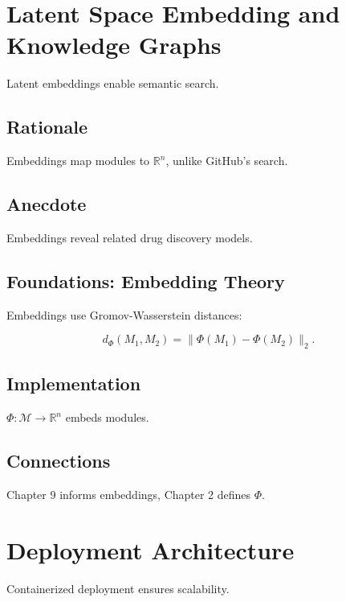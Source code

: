 \documentclass[12pt]{article}
\begin{document}
\section{Latent Space Embedding and Knowledge Graphs}
\label{sec:chapter11}

Latent embeddings enable semantic search.

\subsection{Rationale}
Embeddings map modules to $\mathbb{R}^n$, unlike GitHub’s search.

\subsection{Anecdote}
Embeddings reveal related drug discovery models.

\subsection{Foundations: Embedding Theory}
Embeddings use Gromov-Wasserstein distances:

\[
d_\Phi(M_1, M_2) = \|\Phi(M_1) - \Phi(M_2)\|_2.
\]

\subsection{Implementation}
$\Phi : \mathcal{M} \to \mathbb{R}^n$ embeds modules.

\begin{center}
\end{center}

\subsection{Connections}
Chapter 9 informs embeddings, Chapter 2 defines $\Phi$.

\section{Deployment Architecture}
\label{sec:chapter12}

Containerized deployment ensures scalability.
\end{document}
